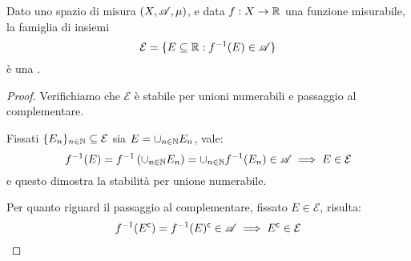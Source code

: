 \begin{proposition}
	\label{CounterImgMis}
	Dato uno spazio di misura $(X,\mathscr A,\mu)$, e data $f:X\rightarrow \mathbb R$ una funzione misurabile, la famiglia di insiemi
	\[
		\mathcal{E} = \{ E\subseteq \mathbb R : f^{-1}(E)\in \mathscr A \}
	\]
	è una \sigalg{}.
\end{proposition}
\begin{proof}
	Verifichiamo che $\mathcal E$ è stabile per unioni numerabili e passaggio al complementare.
	
	Fissati $\{E_n\}_{n\in \mathbb N}\subseteq \mathcal{E}$ sia $E = \cup_{n\in \mathbb N}E_n$, vale:
	\begin{equation*}
		f^{-1}(E)=f^{-1}\left(\cup_{n\in \mathbb N}E_n\right) = \cup_{n\in \mathbb N}f^{-1}(E_n)\in \mathscr A \implies E \in \mathcal{E}
	\end{equation*}
	e questo dimostra la stabilità per unione numerabile.
	
	Per quanto riguard il passaggio al complementare, fissato $E\in \mathcal{E}$, risulta:
	\begin{equation*}
		f^{-1}(E^\mathsf{c})= f^{-1}(E)^\mathsf{c} \in \mathscr A \implies E^\mathsf{c} \in \mathcal{E}
	\end{equation*}
\end{proof}

